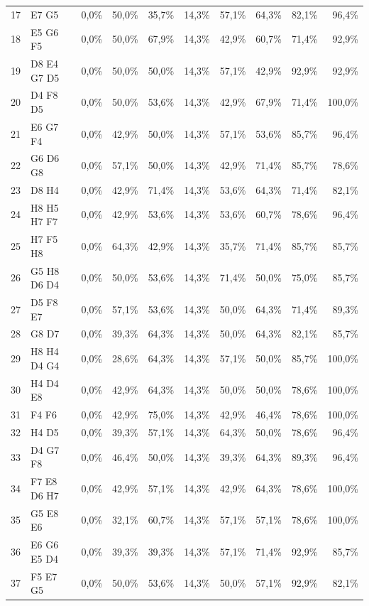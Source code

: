 \begin{small}
\begin{longtable}{@{}rlrrrrrrrr@{}}
17 & E7 G5 & 0,0\% & 50,0\% & 35,7\% & 14,3\% & 57,1\% & 64,3\% & 82,1\% & 96,4\% \\
18 & E5 G6 F5 & 0,0\% & 50,0\% & 67,9\% & 14,3\% & 42,9\% & 60,7\% & 71,4\% & 92,9\% \\
19 & D8 E4 G7 D5 & 0,0\% & 50,0\% & 50,0\% & 14,3\% & 57,1\% & 42,9\% & 92,9\% & 92,9\% \\
20 & D4 F8 D5 & 0,0\% & 50,0\% & 53,6\% & 14,3\% & 42,9\% & 67,9\% & 71,4\% & 100,0\% \\
21 & E6 G7 F4 & 0,0\% & 42,9\% & 50,0\% & 14,3\% & 57,1\% & 53,6\% & 85,7\% & 96,4\% \\
22 & G6 D6 G8 & 0,0\% & 57,1\% & 50,0\% & 14,3\% & 42,9\% & 71,4\% & 85,7\% & 78,6\% \\
23 & D8 H4 & 0,0\% & 42,9\% & 71,4\% & 14,3\% & 53,6\% & 64,3\% & 71,4\% & 82,1\% \\
24 & H8 H5 H7 F7 & 0,0\% & 42,9\% & 53,6\% & 14,3\% & 53,6\% & 60,7\% & 78,6\% & 96,4\% \\
25 & H7 F5 H8 & 0,0\% & 64,3\% & 42,9\% & 14,3\% & 35,7\% & 71,4\% & 85,7\% & 85,7\% \\
26 & G5 H8 D6 D4 & 0,0\% & 50,0\% & 53,6\% & 14,3\% & 71,4\% & 50,0\% & 75,0\% & 85,7\% \\
27 & D5 F8 E7 & 0,0\% & 57,1\% & 53,6\% & 14,3\% & 50,0\% & 64,3\% & 71,4\% & 89,3\% \\
28 & G8 D7 & 0,0\% & 39,3\% & 64,3\% & 14,3\% & 50,0\% & 64,3\% & 82,1\% & 85,7\% \\
29 & H8 H4 D4 G4 & 0,0\% & 28,6\% & 64,3\% & 14,3\% & 57,1\% & 50,0\% & 85,7\% & 100,0\% \\
30 & H4 D4 E8 & 0,0\% & 42,9\% & 64,3\% & 14,3\% & 50,0\% & 50,0\% & 78,6\% & 100,0\% \\
31 & F4 F6 & 0,0\% & 42,9\% & 75,0\% & 14,3\% & 42,9\% & 46,4\% & 78,6\% & 100,0\% \\
32 & H4 D5 & 0,0\% & 39,3\% & 57,1\% & 14,3\% & 64,3\% & 50,0\% & 78,6\% & 96,4\% \\
33 & D4 G7 F8 & 0,0\% & 46,4\% & 50,0\% & 14,3\% & 39,3\% & 64,3\% & 89,3\% & 96,4\% \\
34 & F7 E8 D6 H7 & 0,0\% & 42,9\% & 57,1\% & 14,3\% & 42,9\% & 64,3\% & 78,6\% & 100,0\% \\
35 & G5 E8 E6 & 0,0\% & 32,1\% & 60,7\% & 14,3\% & 57,1\% & 57,1\% & 78,6\% & 100,0\% \\
36 & E6 G6 E5 D4 & 0,0\% & 39,3\% & 39,3\% & 14,3\% & 57,1\% & 71,4\% & 92,9\% & 85,7\% \\
37 & F5 E7 G5 & 0,0\% & 50,0\% & 53,6\% & 14,3\% & 50,0\% & 57,1\% & 92,9\% & 82,1\% \\

\end{longtable}
\end{small}

